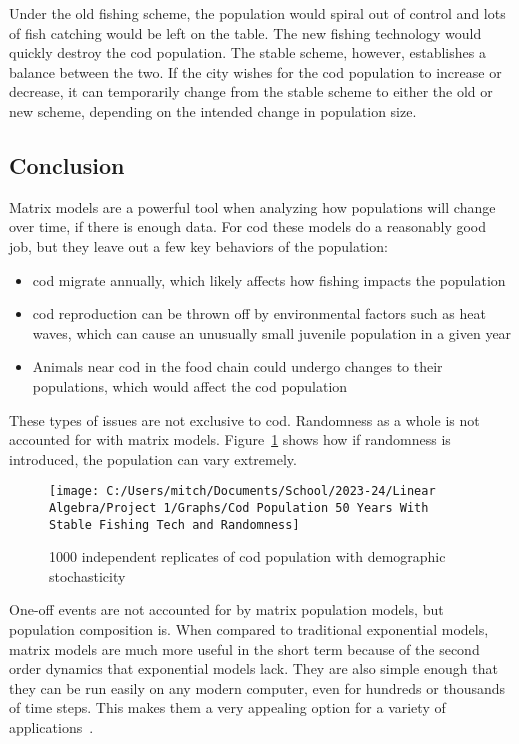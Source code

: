 \documentclass{article}
\begin{document}
    Under the old fishing scheme, the population would spiral out of control and lots of fish catching would be left on the table.
    The new fishing technology would quickly destroy the cod population.
    The stable scheme, however, establishes a balance between the two.
    If the city wishes for the cod population to increase or decrease, it can temporarily change from the stable scheme to either the old or new scheme, depending on the intended change in population size.

    \newpage
    \begin{center}
        \section{Conclusion}\label{sec:conclusion}
    \end{center}

    Matrix models are a powerful tool when analyzing how populations will change over time, if there is enough data.
    For cod these models do a reasonably good job, but they leave out a few key behaviors of the population:
    \begin{itemize}
        \item cod migrate annually, which likely affects how fishing impacts the population
        \item cod reproduction can be thrown off by environmental factors such as heat waves, which can cause an unusually small juvenile population in a given year
        \item Animals near cod in the food chain could undergo changes to their populations, which would affect the cod population
    \end{itemize}

    These types of issues are not exclusive to cod.
    Randomness as a whole is not accounted for with matrix models.
    Figure~\ref{fig:randomness_stable} shows how if randomness is introduced, the population can vary extremely.
    \begin{figure} [!h]
        \centering
        \texttt{[image: C:/Users/mitch/Documents/School/2023-24/Linear Algebra/Project 1/Graphs/Cod Population 50 Years With Stable Fishing Tech and Randomness]}
        \caption{1000 independent replicates of cod population with demographic stochasticity}
        \label{fig:randomness_stable}
    \end{figure}  %

    One-off events are not accounted for by matrix population models, but population composition is.
    When compared to traditional exponential models, matrix models are much more useful in the short term because of the second order dynamics that exponential models lack.
    They are also simple enough that they can be run easily on any modern computer, even for hundreds or thousands of time steps.
    This makes them a very appealing option for a variety of applications~\cite{shoemaker_lab_2024}.
\end{document}
